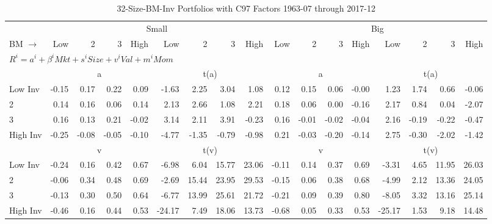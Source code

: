 
\begin{table}[!ht]
\footnotesize
\centering
\caption{32-Size-BM-Inv Portfolios with C97 Factors 1963-07 through 2017-12}
\begin{tabular}{lrrrrrrrrrrrrrrrr}
  \toprule
    & \multicolumn{8}{c}{Small} & \multicolumn{8}{c}{Big} \\
      \cmidrule(r){2-9} \cmidrule(r){10-17}
    BM $\rightarrow$ & Low & 2 & 3 & High & Low & 2 & 3 & High & Low & 2 & 3 & High & Low & 2 & 3 & High \\ 
  \midrule
  \multicolumn{17}{l}{$R^i=a^i+\beta^iMkt+s^iSize+v^iVal+m^iMom$} \\

  
    
      & \multicolumn{4}{c}{a} & \multicolumn{4}{c}{t(a)}
    
      & \multicolumn{4}{c}{a} & \multicolumn{4}{c}{t(a)}
    
    \\
      \cmidrule(r){2-5} \cmidrule(r){6-9} \cmidrule(r){10-13} \cmidrule(r){14-17}

    Low Inv   & -0.15  & 0.17  & 0.22  & 0.09  & -1.63  & 2.25  & 3.04  & 1.08  & 0.12  & 0.15  & 0.06  & -0.00  & 1.23  & 1.74  & 0.66  & -0.06  \\
           2  & 0.14  & 0.16  & 0.06  & 0.14  & 2.13  & 2.66  & 1.08  & 2.21  & 0.18  & 0.06  & 0.00  & -0.16  & 2.17  & 0.84  & 0.04  & -2.07  \\
           3  & 0.16  & 0.13  & 0.21  & -0.02  & 3.14  & 2.11  & 3.91  & -0.23  & 0.16  & -0.01  & -0.02  & -0.04  & 2.16  & -0.19  & -0.22  & -0.47  \\
    High Inv  & -0.25  & -0.08  & -0.05  & -0.10  & -4.77  & -1.35  & -0.79  & -0.98  & 0.21  & -0.03  & -0.20  & -0.14  & 2.75  & -0.30  & -2.02  & -1.42  \\

  
    
      & \multicolumn{4}{c}{v} & \multicolumn{4}{c}{t(v)}
    
      & \multicolumn{4}{c}{v} & \multicolumn{4}{c}{t(v)}
    
    \\
      \cmidrule(r){2-5} \cmidrule(r){6-9} \cmidrule(r){10-13} \cmidrule(r){14-17}

    Low Inv   & -0.24  & 0.16  & 0.42  & 0.67  & -6.98  & 6.04  & 15.77  & 23.06  & -0.11  & 0.14  & 0.37  & 0.69  & -3.31  & 4.65  & 11.95  & 26.03  \\
           2  & -0.06  & 0.34  & 0.48  & 0.69  & -2.69  & 15.44  & 23.95  & 29.53  & -0.15  & 0.06  & 0.38  & 0.68  & -4.99  & 2.12  & 13.36  & 24.05  \\
           3  & -0.13  & 0.30  & 0.50  & 0.64  & -6.77  & 13.99  & 25.61  & 21.72  & -0.21  & 0.09  & 0.39  & 0.80  & -8.05  & 3.32  & 13.16  & 25.14  \\
    High Inv  & -0.46  & 0.16  & 0.44  & 0.53  & -24.17  & 7.49  & 18.06  & 13.73  & -0.68  & 0.05  & 0.33  & 0.53  & -25.17  & 1.53  & 9.18  & 14.48  \\


\end{tabular}
\end{table}

